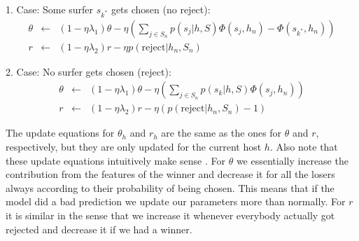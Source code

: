 1. Case: Some surfer $s_{k^*}$ gets chosen (no reject):
\begin{eqnarray}
\theta &\leftarrow& (1- \eta \lambda_1) \theta - \eta (\sum_{j \in S_n} p(s_j | h, S) \Phi(s_j,h_n) - \Phi(s_{k^*},h_n))\\
r &\leftarrow& (1- \eta \lambda_2) r - \eta p(\text{reject} | h_n, S_n)
\end{eqnarray}

2. Case: No surfer gets chosen (reject):
\begin{eqnarray}
\theta &\leftarrow& (1- \eta \lambda_1) \theta - \eta (\sum_{j \in S_n} p(s_k | h, S) \Phi(s_j,h_n))\\
r &\leftarrow& (1- \eta \lambda_2) r - \eta (p(\text{reject} | h_n, S_n)-1)
\end{eqnarray}

The update equations for $\theta_h$ and $r_h$ are the same as the ones for $\theta$ and $r$, respectively, but they are only updated for the current host $h$. 
Also note that these update equations intuitively make sense . For $\theta$ we essentially increase the contribution from the features of the winner and decrease it for all the losers always according to their probability of being chosen. This means that if the model did a bad prediction we update our parameters more than normally. For $r$ it is similar in the sense that we increase it whenever everybody actually got rejected and decrease it if we had a winner.


